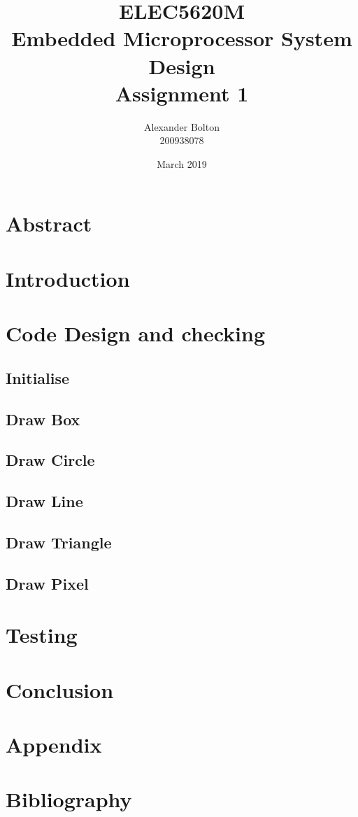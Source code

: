 \documentclass[a4paper,12pt]{article}
\begin{document}
\title{ELEC5620M \\ Embedded Microprocessor System Design \\ Assignment 1}
\author{Alexander Bolton \\ 200938078}
\date{March 2019}
\maketitle
\section{Abstract}
\newpage

\tableofcontents
\newpage

\section{Introduction}

\section{Code Design and checking}
\subsection{Initialise}
\subsection{Draw Box}
\subsection{Draw Circle}
\subsection{Draw Line}
\subsection{Draw Triangle}
\subsection{Draw Pixel}
\section{Testing}

\section{Conclusion}

\section{Appendix}

\section{Bibliography}
\end{document}
